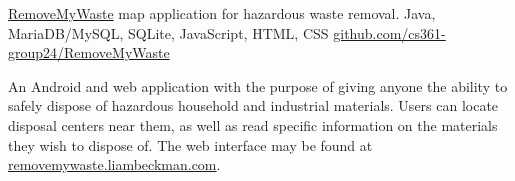 \showoff
{\textcolor{my-blue}{\href{https://removemywaste.liambeckman.com/}{RemoveMyWaste}}}
{map application for hazardous waste removal.}
{Java, MariaDB/MySQL, SQLite, JavaScript, HTML, CSS}
{\textcolor{my-blue}{\href{https://github.com/cs361-group24/RemoveMyWaste}{github.com/cs361-group24/RemoveMyWaste}}}

An Android and web application with the purpose of giving anyone the ability to safely dispose of hazardous household and industrial materials. Users can locate disposal centers near them, as well as read specific information on the materials they wish to dispose of. The web interface may be found at \textcolor{my-blue}{\href{https://removemywaste.liambeckman.com}{removemywaste.liambeckman.com}}.

\myBreak

